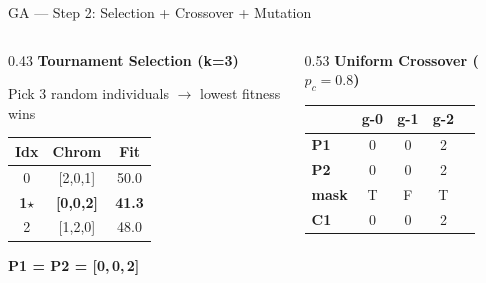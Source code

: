 \documentclass[aspectratio=169]{beamer}
\begin{document}
\begin{frame}{GA --- Step 2: Selection + Crossover + Mutation}
  \begin{columns}[T]
    \begin{column}{0.43\textwidth}
      \colorbox{navymid}{\color{teallt}\bfseries\small
        Tournament Selection (k=3)}
      \vspace{3pt}

      {\scriptsize Pick 3 random individuals $\to$ lowest fitness wins}\\[3pt]

      \begin{tabular}{ccc}
        \toprule
        \rowcolor{navy}
          \color{white}\bfseries Idx &
          \color{white}\bfseries Chrom &
          \color{white}\bfseries Fit \\
        \midrule
        0 & [2,0,1] & 50.0 \\
        \rowcolor{lightgreen}
        \bfseries 1$\star$ & \bfseries[0,0,2] &
          \cellcolor{mygreen}\color{white}\bfseries 41.3 \\
        2 & [1,2,0] & 48.0 \\
        \bottomrule
      \end{tabular}

      \vspace{4pt}
      {\small\bfseries\color{navy} P1 = P2 = [0,\,0,\,2]}
    \end{column}

    \begin{column}{0.53\textwidth}
      \colorbox{navymid}{\color{teallt}\bfseries\small
        Uniform Crossover ($p_c=0.8$)}
      \vspace{3pt}

      \begin{tabular}{lcccc}
        \toprule
        \rowcolor{navy}
          \color{white} &
          \color{white}g-0 & \color{white}g-1 & \color{white}g-2 \\
        \midrule
        \cellcolor{teal}\color{white}\bfseries P1 & 0 & 0 & 2 \\
        \cellcolor{teal}\color{white}\bfseries P2 & 0 & 0 & 2 \\
        \cellcolor{navymid}\color{teallt}\bfseries mask & T & F & T \\
        \cellcolor{lightgreen}\bfseries C1 & 0 & 0 & 2 \\
        \bottomrule
      \end{tabular}
    \end{column}
  \end{columns}


\end{frame}
\end{document}
